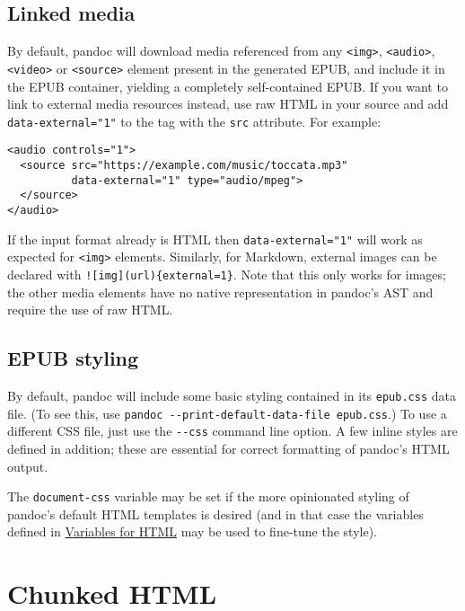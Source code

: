 \documentclass[
  a4paper,
]{article}
\begin{document}
\hypertarget{linked-media}{%
\subsection{Linked media}\label{linked-media}}

By default, pandoc will download media referenced from any
\texttt{\textless{}img\textgreater{}},
\texttt{\textless{}audio\textgreater{}},
\texttt{\textless{}video\textgreater{}} or
\texttt{\textless{}source\textgreater{}} element present in the
generated EPUB, and include it in the EPUB container, yielding a
completely self-contained EPUB. If you want to link to external media
resources instead, use raw HTML in your source and add
\texttt{data-external="1"} to the tag with the \texttt{src} attribute.
For example:

\begin{verbatim}
<audio controls="1">
  <source src="https://example.com/music/toccata.mp3"
          data-external="1" type="audio/mpeg">
  </source>
</audio>
\end{verbatim}

If the input format already is HTML then \texttt{data-external="1"} will
work as expected for \texttt{\textless{}img\textgreater{}} elements.
Similarly, for Markdown, external images can be declared with
\texttt{!{[}img{]}(url)\{external=1\}}. Note that this only works for
images; the other media elements have no native representation in
pandoc's AST and require the use of raw HTML.

\hypertarget{epub-styling}{%
\subsection{EPUB styling}\label{epub-styling}}

By default, pandoc will include some basic styling contained in its
\texttt{epub.css} data file. (To see this, use
\texttt{pandoc\ -\/-print-default-data-file\ epub.css}.) To use a
different CSS file, just use the \texttt{-\/-css} command line option. A
few inline styles are defined in addition; these are essential for
correct formatting of pandoc's HTML output.

The \texttt{document-css} variable may be set if the more opinionated
styling of pandoc's default HTML templates is desired (and in that case
the variables defined in
\protect\hyperlink{variables-for-html}{Variables for HTML} may be used
to fine-tune the style).

\hypertarget{chunked-html}{%
\section{Chunked HTML}\label{chunked-html}}
\end{document}
